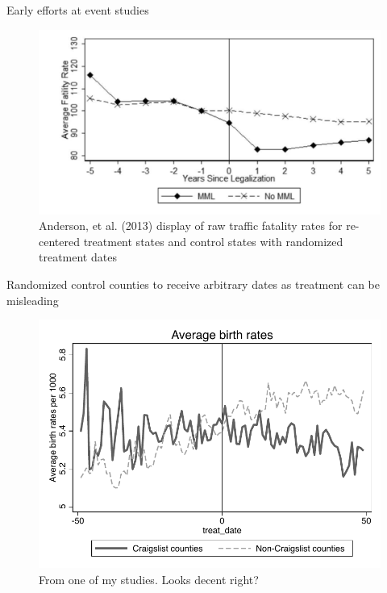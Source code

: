 \documentclass{beamer}
\begin{document}
\begin{frame}{Early efforts at event studies}

	\begin{figure}
	\includegraphics[scale=0.25]{./lecture_includes/mml_eventstudy.png}
	\caption{Anderson, et al. (2013) display of raw traffic fatality rates for re-centered treatment states and control states with randomized treatment dates}
	\end{figure}

\end{frame}

\begin{frame}{Randomized control counties to receive arbitrary dates as treatment can be misleading}

	\begin{figure}
	\includegraphics[scale=0.5]{./lecture_includes/dd.pdf}
	\caption{From one of my studies. Looks decent right?}
	\end{figure}

\end{frame}
\end{document}
